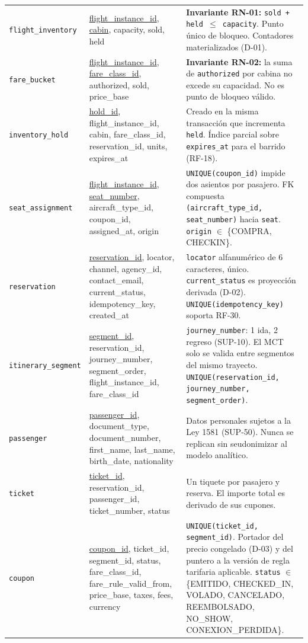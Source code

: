 \documentclass[10pt,letterpaper]{article}
\begin{document}
\begin{longtable}{@{}L{3.0cm} L{6.6cm} L{6.2cm}@{}}
\texttt{flight\_inventory} & \underline{flight\_instance\_id}, \underline{cabin}, capacity, sold, held & \textbf{Invariante RN-01:} \texttt{sold + held $\le$ capacity}. Punto único de bloqueo. Contadores materializados (D-01). \\
\texttt{fare\_bucket} & \underline{flight\_instance\_id}, \underline{fare\_class\_id}, authorized, sold, price\_base & \textbf{Invariante RN-02:} la suma de \texttt{authorized} por cabina no excede su capacidad. No es punto de bloqueo válido. \\
\texttt{inventory\_hold} & \underline{hold\_id}, flight\_instance\_id, cabin, fare\_class\_id, reservation\_id, units, expires\_at & Creado en la misma transacción que incrementa \texttt{held}. Índice parcial sobre \texttt{expires\_at} para el barrido (RF-18). \\
\texttt{seat\_assignment} & \underline{flight\_instance\_id}, \underline{seat\_number}, aircraft\_type\_id, coupon\_id, assigned\_at, origin & \texttt{UNIQUE(coupon\_id)} impide dos asientos por pasajero. FK compuesta \texttt{(aircraft\_type\_id, seat\_number)} hacia \texttt{seat}. \texttt{origin} $\in$ \{COMPRA, CHECKIN\}. \\
\texttt{reservation} & \underline{reservation\_id}, locator, channel, agency\_id, contact\_email, current\_status, idempotency\_key, created\_at & \texttt{locator} alfanumérico de 6 caracteres, único. \texttt{current\_status} es proyección derivada (D-02). \texttt{UNIQUE(idempotency\_key)} soporta RF-30. \\
\texttt{itinerary\_segment} & \underline{segment\_id}, reservation\_id, journey\_number, segment\_order, flight\_instance\_id, fare\_class\_id & \texttt{journey\_number}: 1 ida, 2 regreso (SUP-10). El MCT solo se valida entre segmentos del mismo trayecto. \texttt{UNIQUE(reservation\_id, journey\_number, segment\_order)}. \\
\texttt{passenger} & \underline{passenger\_id}, document\_type, document\_number, first\_name, last\_name, birth\_date, nationality & Datos personales sujetos a la Ley 1581 (SUP-50). Nunca se replican sin seudonimizar al modelo analítico. \\
\texttt{ticket} & \underline{ticket\_id}, reservation\_id, passenger\_id, ticket\_number, status & Un tiquete por pasajero y reserva. El importe total es derivado de sus cupones. \\
\texttt{coupon} & \underline{coupon\_id}, ticket\_id, segment\_id, status, fare\_class\_id, fare\_rule\_valid\_from, price\_base, taxes, fees, currency & \texttt{UNIQUE(ticket\_id, segment\_id)}. Portador del precio congelado (D-03) y del puntero a la versión de regla tarifaria aplicable. \texttt{status} $\in$ \{EMITIDO, CHECKED\_IN, VOLADO, CANCELADO, REEMBOLSADO, NO\_SHOW, CONEXION\_PERDIDA\}. \\

\end{longtable}
\end{document}
